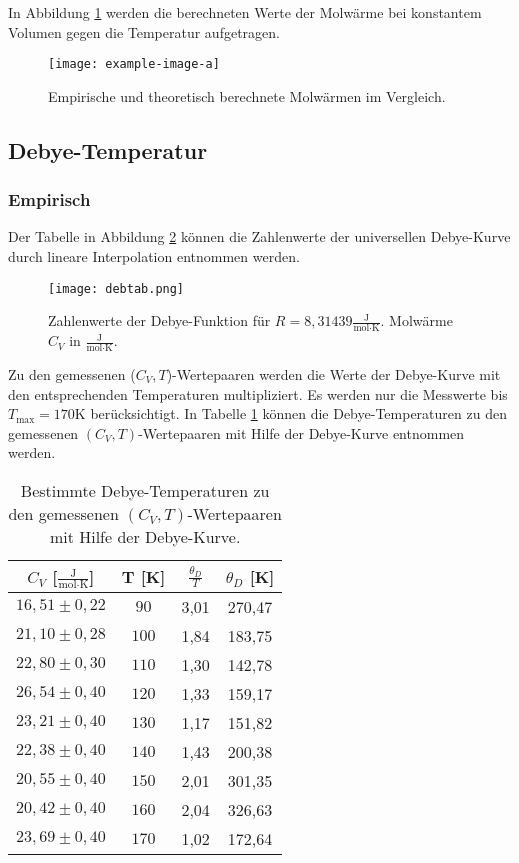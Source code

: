 In Abbildung \ref{C_V} werden die berechneten Werte der Molwärme bei konstantem Volumen gegen die Temperatur aufgetragen.

\begin{figure}[H]
  \centering
  \texttt{[image: example-image-a]}
  \caption{Empirische und theoretisch berechnete Molwärmen im Vergleich.}
  \label{C_V}
\end{figure}

\subsection{Debye-Temperatur}
\subsubsection{Empirisch}

Der Tabelle in Abbildung \ref{debfkt} können die Zahlenwerte der universellen Debye-Kurve durch lineare Interpolation entnommen werden.

\begin{figure}[H]
  \centering
  \texttt{[image: debtab.png]}
  \caption{Zahlenwerte der Debye-Funktion für $R = 8,31439\frac{\text{J}}{\text{mol}\cdot\text{K}}$. Molwärme $C_V$ in $\frac{\text{J}}{\text{mol}\cdot\text{K}}$. \cite{skript}}
  \label{debfkt}
\end{figure}

Zu den gemessenen ($C_V,T$)-Wertepaaren werden die Werte der Debye-Kurve mit den entsprechenden Temperaturen multipliziert.
Es werden nur die Messwerte bis $T_{\text{max}} = 170$K berücksichtigt.
In Tabelle \ref{tab:3} können die Debye-Temperaturen zu den gemessenen $(C_V,T)$-Wertepaaren mit Hilfe der Debye-Kurve entnommen werden.

\begin{table}[H]
  \centering
  \begin{tabular}{cccc}
    \toprule
    $C_V$ [$\frac{\text{J}}{\text{mol}\cdot\text{K}}$] & T [K] & $\frac{\theta_D}{T}$ & $\theta_D$ [K] \\
    \midrule
    $16,51 \pm 0,22$ & $ 90$ & 3,01 & 270,47 \\
    $21,10 \pm 0,28$ & $100$ & 1,84 & 183,75 \\
    $22,80 \pm 0,30$ & $110$ & 1,30 & 142,78 \\
    $26,54 \pm 0,40$ & $120$ & 1,33 & 159,17 \\
    $23,21 \pm 0,40$ & $130$ & 1,17 & 151,82 \\
    $22,38 \pm 0,40$ & $140$ & 1,43 & 200,38 \\
    $20,55 \pm 0,40$ & $150$ & 2,01 & 301,35 \\
    $20,42 \pm 0,40$ & $160$ & 2,04 & 326,63 \\
    $23,69 \pm 0,40$ & $170$ & 1,02 & 172,64 \\
    \bottomrule
  \end{tabular}
  \caption{Bestimmte Debye-Temperaturen zu den gemessenen $(C_V,T)$-Wertepaaren mit Hilfe der Debye-Kurve.}
  \label{tab:3}
\end{table}

